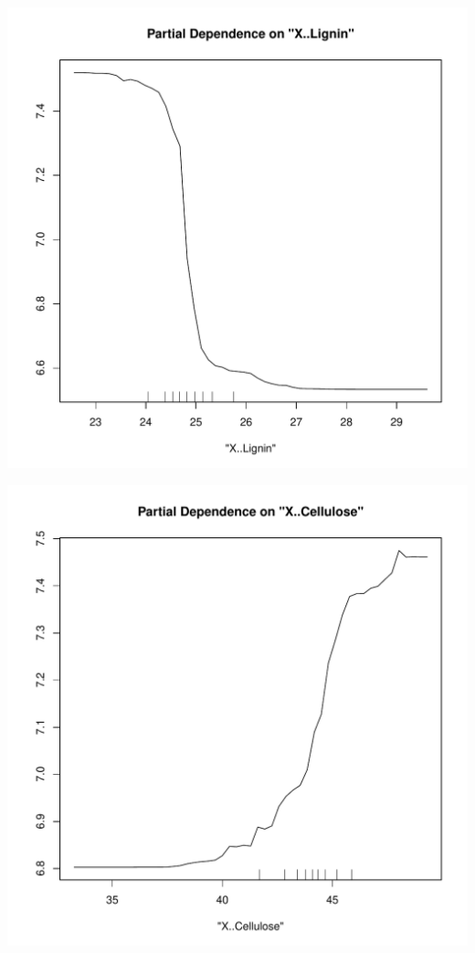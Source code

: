 \documentclass{article}\usepackage[]{graphicx}\usepackage[]{color}
\makeatletter
\def\maxwidth{ %
  \ifdim\Gin@nat@width>\linewidth
    \linewidth
  \else
    \Gin@nat@width
  \fi
}
\newenvironment{knitrout}{}{} %
\makeatother
\begin{document}
\begin{knitrout}
\color{fgcolor}

{\centering \includegraphics[width=\maxwidth]{figure/PartialDependence-1} 

}




{\centering \includegraphics[width=\maxwidth]{figure/PartialDependence-2} 

}
\end{knitrout}
\end{document}
